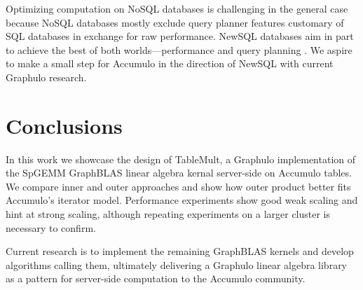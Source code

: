 Optimizing computation on NoSQL databases is challenging in the general case because
NoSQL databases mostly exclude query planner features 
customary of SQL databases in exchange for raw performance.
NewSQL databases aim in part to achieve the best of both worlds---performance and query planning \cite{grolinger2013data}.
We aspire to make a small step for Accumulo in the direction of NewSQL with current Graphulo research.






\section{Conclusions}
\label{sConclusions}

In this work we showcase the design of TableMult, a Graphulo implementation of the 
SpGEMM GraphBLAS linear algebra kernal server-side on Accumulo tables.
We compare inner and outer approaches and show how outer product 
better fits Accumulo's iterator model.
Performance experiments show good weak scaling and hint at strong scaling,
although repeating experiments on a larger cluster is necessary to confirm.

Current research is to implement the remaining GraphBLAS kernels 
and develop algorithms calling them, %
ultimately delivering a Graphulo linear algebra library 
as a pattern for server-side computation
to the Accumulo community.
